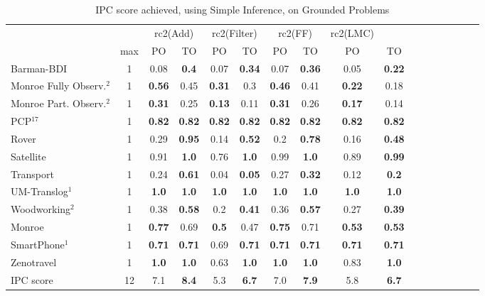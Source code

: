 \documentclass[letterpaper]{article} %
\begin{document}
\begin{table*}[h]
	\centering
	\caption{IPC score achieved, using Simple Inference, on Grounded Problems}
	\scalebox{1} {
\begin{tabular}{lccccccccccccccccl} 
	\toprule 
	&& \multicolumn{2}{c}{rc2(Add)} & \multicolumn{2}{c}{rc2(Filter)} & \multicolumn{2}{c}{rc2(FF)} & \multicolumn{2}{c}{rc2(LMC)} \\ 
	\cmidrule(lr){3-4} \cmidrule(lr){5-6} \cmidrule(lr){7-8} \cmidrule(lr){9-10}  
	& max &PO & TO & PO & TO & PO & TO & PO &\multicolumn{2}{c}{ TO  } \\ 
	\midrule 
	Barman-BDI & 1 & 0.08 & \textbf{0.4} & 0.07 & \textbf{0.34} & 0.07 & \textbf{0.36} & 0.05 &\multicolumn{2}{c}{ \textbf{0.22}  } \\ 
	Monroe Fully Observ.$^{2}$ & 1 & \textbf{0.56} & 0.45 & \textbf{0.31} & 0.3 & \textbf{0.46} & 0.41 & \textbf{0.22} &\multicolumn{2}{c}{ 0.18  } \\ 
	Monroe Part. Observ.$^{2}$ & 1 & \textbf{0.31} & 0.25 & \textbf{0.13} & 0.11 & \textbf{0.31} & 0.26 & \textbf{0.17} &\multicolumn{2}{c}{ 0.14  } \\ 
	PCP$^{17}$ & 1 & \textbf{0.82} & \textbf{0.82} & \textbf{0.82} & \textbf{0.82} & \textbf{0.82} & \textbf{0.82} & \textbf{0.82} &\multicolumn{2}{c}{ \textbf{0.82}  } \\ 
	Rover & 1 & 0.29 & \textbf{0.95} & 0.14 & \textbf{0.52} & 0.2 & \textbf{0.78} & 0.16 &\multicolumn{2}{c}{ \textbf{0.48}  } \\ 
	Satellite & 1 & 0.91 & \textbf{1.0} & 0.76 & \textbf{1.0} & 0.99 & \textbf{1.0} & 0.89 &\multicolumn{2}{c}{ \textbf{0.99}  } \\ 
	Transport & 1 & 0.24 & \textbf{0.61} & 0.04 & \textbf{0.05} & 0.27 & \textbf{0.32} & 0.12 &\multicolumn{2}{c}{ \textbf{0.2}  } \\ 
	UM-Translog$^{1}$ & 1 & \textbf{1.0} & \textbf{1.0} & \textbf{1.0} & \textbf{1.0} & \textbf{1.0} & \textbf{1.0} & \textbf{1.0} &\multicolumn{2}{c}{ \textbf{1.0}  } \\ 
	Woodworking$^{2}$ & 1 & 0.38 & \textbf{0.58} & 0.2 & \textbf{0.41} & 0.36 & \textbf{0.57} & 0.27 &\multicolumn{2}{c}{ \textbf{0.39}  } \\ 
	\midrule 
	Monroe & 1 & \textbf{0.77} & 0.69 & \textbf{0.5} & 0.47 & \textbf{0.75} & 0.71 & \textbf{0.53} &\multicolumn{2}{c}{ \textbf{0.53}  } \\ 
	SmartPhone$^{1}$ & 1 & \textbf{0.71} & \textbf{0.71} & 0.69 & \textbf{0.71} & \textbf{0.71} & \textbf{0.71} & \textbf{0.71} &\multicolumn{2}{c}{ \textbf{0.71}  } \\ 
	Zenotravel & 1 & \textbf{1.0} & \textbf{1.0} & 0.63 & \textbf{1.0} & \textbf{1.0} & \textbf{1.0} & 0.83 &\multicolumn{2}{c}{ \textbf{1.0}  } \\ 
	\midrule 
	IPC score & 12 & 7.1 & \textbf{8.4} & 5.3 & \textbf{6.7} & 7.0 & \textbf{7.9} & 5.8 &\multicolumn{2}{c}{ \textbf{6.7}  } \\
	\bottomrule 
\end{tabular} 
	}
\end{table*}
\end{document}
